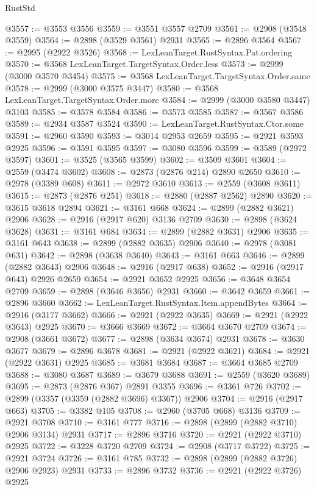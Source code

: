 \begin{lexlean}{RustStd}
\begin{coremodule}
@3557 := @3553 @3556
@3559 := @3551 @3557 @2709
@3561 := @2908 (@3548 @3559)
@3564 := @2898 (@3529 @3561) @2931
@3565 := @2896 @3564
@3567 := @2995 (@2922 @3526)
@3568 := LexLeanTarget.RustSyntax.Pat.ordering
@3570 := @3568 LexLeanTarget.TargetSyntax.Order.less
@3573 := @2999 (@3000 @3570 @3454)
@3575 := @3568 LexLeanTarget.TargetSyntax.Order.same
@3578 := @2999 (@3000 @3575 @3447)
@3580 := @3568 LexLeanTarget.TargetSyntax.Order.more
@3584 := @2999 (@3000 @3580 @3447) @3103
@3585 := @3578 @3584
@3586 := @3573 @3585
@3587 := @3567 @3586
@3589 := @2934 @3587 @3524
@3590 := LexLeanTarget.RustSyntax.Ctor.some
@3591 := @2960 @3590
@3593 := @3014 @2953 @2659
@3595 := @2921 @3593 @2925
@3596 := @3591 @3595
@3597 := @3080 @3596
@3599 := @3589 (@2972 @3597)
@3601 := @3525 (@3565 @3599)
@3602 := @3509 @3601
@3604 := @2559 (@3474 @3602)
@3608 := @2873 (@2876 @214) @2890 @2650
@3610 := @2978 (@3389 @608)
@3611 := @2972 @3610
@3613 := @2559 (@3608 @3611)
@3615 := @2873 (@2876 @251)
@3618 := @2880 (@2887 @2562) @2890
@3620 := @3615 @3618 @2894
@3621 := @3161 @668
@3624 := @2899 (@2882 @3621) @2906
@3628 := @2916 (@2917 @620) @3136 @2709
@3630 := @2898 (@3624 @3628)
@3631 := @3161 @684
@3634 := @2899 (@2882 @3631) @2906
@3635 := @3161 @643
@3638 := @2899 (@2882 @3635) @2906
@3640 := @2978 (@3081 @631)
@3642 := @2898 (@3638 @3640)
@3643 := @3161 @663
@3646 := @2899 (@2882 @3643) @2906
@3648 := @2916 (@2917 @638)
@3652 := @2916 (@2917 @643) @2926 @2659
@3654 := @2921 @3652 @2925
@3656 := @3648 @3654 @2709
@3659 := @2898 (@3646 @3656) @2931
@3660 := @3642 @3659
@3661 := @2896 @3660
@3662 := LexLeanTarget.RustSyntax.Item.appendBytes
@3664 := @2916 (@3177 @3662)
@3666 := @2921 (@2922 @3635)
@3669 := @2921 (@2922 @3643) @2925
@3670 := @3666 @3669
@3672 := @3664 @3670 @2709
@3674 := @2908 (@3661 @3672)
@3677 := @2898 (@3634 @3674) @2931
@3678 := @3630 @3677
@3679 := @2896 @3678
@3681 := @2921 (@2922 @3621)
@3684 := @2921 (@2922 @3631) @2925
@3685 := @3681 @3684
@3687 := @3664 @3685 @2709
@3688 := @3080 @3687
@3689 := @3679 @3688
@3691 := @2559 (@3620 @3689)
@3695 := @2873 (@2876 @367) @2891 @3355
@3696 := @3361 @726
@3702 := @2899 (@3357 (@3359 (@2882 @3696) @3367)) @2906
@3704 := @2916 (@2917 @663)
@3705 := @3382 @105
@3708 := @2960 (@3705 @668) @3136
@3709 := @2921 @3708
@3710 := @3161 @777
@3716 := @2898 (@2899 (@2882 @3710) @2906 @3134) @2931
@3717 := @2896 @3716
@3720 := @2921 (@2922 @3710) @2925
@3722 := @3228 @3720 @2709
@3724 := @2908 (@3717 @3722)
@3725 := @2921 @3724
@3726 := @3161 @785
@3732 := @2898 (@2899 (@2882 @3726) @2906 @2923) @2931
@3733 := @2896 @3732
@3736 := @2921 (@2922 @3726) @2925

\end{coremodule}
\end{lexlean}
